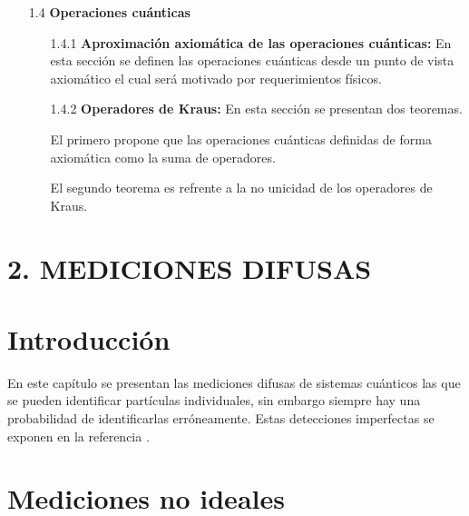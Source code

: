 \documentclass[12pt,oneside]{book}\raggedbottom{} %
\begin{document}
\begin{sloppypar}
{{\begin{itemize}
\begin{itemize}
  En estos casos es importante estudiar las medidas POVM\@. Se define las medidas POVM y se mencionan varias razones por las que  estos operadores son de utilidad.
\end{itemize}
\item[1.4]\textbf{Operaciones cuánticas}
\begin{itemize}
  \item[1.4.1] \textbf{Aproximación axiomática de las operaciones cuánticas:} En esta sección se definen las operaciones cuánticas desde un punto de vista
 axiomático el cual será motivado por requerimientos físicos. 
  \item[1.4.2] \textbf{Operadores de Kraus: }En esta sección se presentan dos teoremas.
  
  El primero propone que las operaciones cuánticas definidas de forma axiomática como la suma de operadores.
  
  El segundo teorema es refrente a la no unicidad de los operadores de Kraus.
\end{itemize}
\end{itemize}

\section*{2. MEDICIONES DIFUSAS}

\section{Introducción}
 En este capítulo se presentan las mediciones difusas de sistemas cuánticos las que se pueden identificar partículas individuales, sin embargo siempre hay una probabilidad de identificarlas erróneamente. Estas detecciones imperfectas se exponen en la referencia {\cite{Pineda_2021}}.

\section{Mediciones no ideales}






}}
\end{sloppypar}
\end{document}
